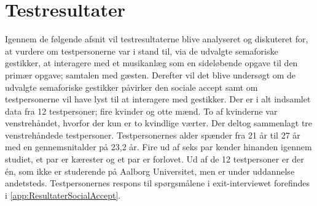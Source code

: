 \chapter{Testresultater}
\label{TestresultaterSocialAccept}
%
Igennem de følgende afsnit vil testresultaterne blive analyseret og diskuteret for, at vurdere om testpersonerne var i stand til, via de udvalgte semaforiske gestikker, at interagere med et musikanlæg som en sideløbende opgave til den primær opgave; samtalen med gæsten. Derefter vil det blive undersøgt om de udvalgte semaforiske gestikker påvirker den sociale accept samt om testpersonerne vil have lyst til at interagere med gestikker.\blankline
%
Der er i alt indsamlet data fra 12 testpersoner; fire kvinder og otte mænd. To af kvinderne var venstrehåndet, hvorfor der kun er to kvindlige værter. Der deltog sammenlagt tre venstrehåndede testpersoner. Testpersonernes alder spænder fra 21 år til 27 år med en gennemsnitalder på 23,2 år. Fire ud af seks par kender hinanden igennem studiet, et par er kærester og et par er forlovet. Ud af de 12 testpersoner er der én, som ikke er studerende på Aalborg Universitet, men er under uddannelse andetsteds. Testpersonernes respons til spørgsmålene i exit-interviewet forefindes i \autoref{app:ResultaterSocialAccept}. 






